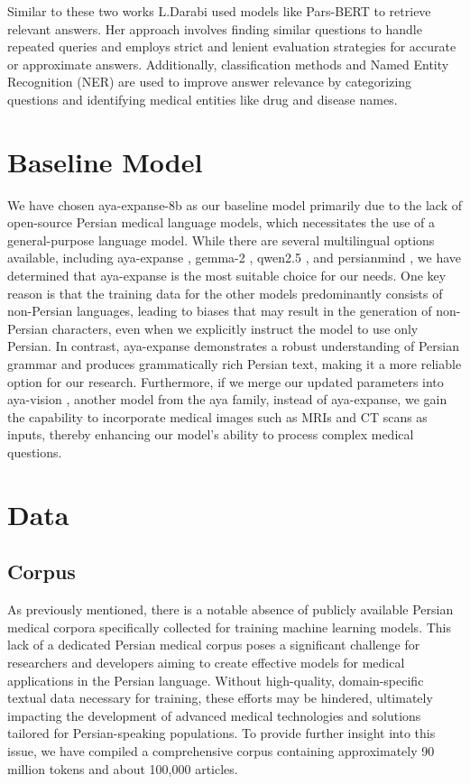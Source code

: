 \documentclass[conference]{IEEEtran}
\begin{document}
	Similar to these two works L.Darabi
	\cite{b14}
	used models like Pars-BERT
	\cite{b15}
	to retrieve relevant answers. Her approach involves finding similar questions to handle repeated queries and employs strict and lenient evaluation strategies for accurate or approximate answers. Additionally, classification methods and Named Entity Recognition (NER) are used to improve answer relevance by categorizing questions and identifying medical entities like drug and disease names.
	
	\section{Baseline Model}
	We have chosen aya-expanse-8b as our baseline model primarily due to the lack of open-source Persian medical language models, which necessitates the use of a general-purpose language model. While there are several multilingual options available, including aya-expanse \cite{b5}, gemma-2 \cite{b16}, qwen2.5 \cite{b17}, and persianmind \cite{b18}, we have determined that aya-expanse is the most suitable choice for our needs. One key reason is that the training data for the other models predominantly consists of non-Persian languages, leading to biases that may result in the generation of non-Persian characters, even when we explicitly instruct the model to use only Persian. In contrast, aya-expanse demonstrates a robust understanding of Persian grammar and produces grammatically rich Persian text, making it a more reliable option for our research. Furthermore, if we merge our updated parameters into aya-vision \cite{b19}, another model from the aya family, instead of aya-expanse, we gain the capability to incorporate medical images such as MRIs and CT scans as inputs, thereby enhancing our model’s ability to process complex medical questions.
	\section{Data}
	
	\subsection{Corpus}
	As previously mentioned, there is a notable absence of publicly available Persian medical corpora specifically collected for training machine learning models. This lack of a dedicated Persian medical corpus poses a significant challenge for researchers and developers aiming to create effective models for medical applications in the Persian language. Without high-quality, domain-specific textual data necessary for training, these efforts may be hindered, ultimately impacting the development of advanced medical technologies and solutions tailored for Persian-speaking populations. To provide further insight into this issue, we have compiled a comprehensive corpus containing approximately 90 million tokens and about 100,000 articles. 
	
\end{document}
